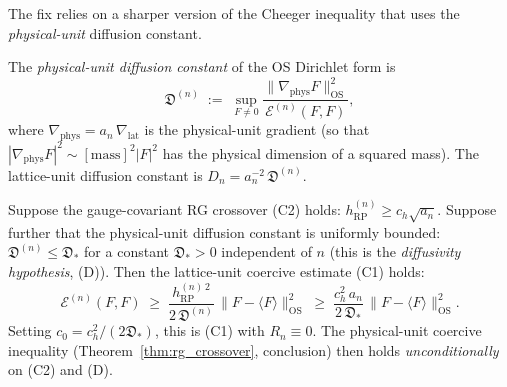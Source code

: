 The fix relies on a sharper version of the Cheeger inequality that
uses the \emph{physical-unit} diffusion constant.

\begin{definition}
\label{def:diff_phys}
The \emph{physical-unit diffusion constant} of the OS Dirichlet
form is
\begin{equation}
\label{eq:D_phys_def}
  \mathfrak{D}^{(n)}
  \;:=\;\sup_{F\ne 0}
  \frac{\|\nabla_{\mathrm{phys}}F\|_{\mathrm{OS}}^{2}}
       {\mathcal{E}^{(n)}(F,F)},
\end{equation}
where $\nabla_{\mathrm{phys}}=a_{n}\,\nabla_{\mathrm{lat}}$ is the
physical-unit gradient (so that
$|\nabla_{\mathrm{phys}}F|^{2}\sim[\mathrm{mass}]^{2}|F|^{2}$ has
the physical dimension of a squared mass). The lattice-unit
diffusion constant is $D_{n}=a_{n}^{-2}\,\mathfrak{D}^{(n)}$.
\end{definition}

\begin{theorem}
\label{thm:sharp_coercive}
Suppose the gauge-covariant RG crossover (C2) holds:
$h_{\mathrm{RP}}^{(n)}\ge c_{h}\sqrt{a_{n}}$. Suppose further
that the physical-unit diffusion constant is uniformly bounded:
$\mathfrak{D}^{(n)}\le\mathfrak{D}_{*}$ for a constant
$\mathfrak{D}_{*}>0$ independent of $n$ (this is the
\emph{diffusivity hypothesis}, (D)). Then the lattice-unit
coercive estimate (C1) holds:
\begin{equation}
\label{eq:sharp_coercive}
  \mathcal{E}^{(n)}(F,F)
  \;\ge\;\frac{h_{\mathrm{RP}}^{(n)\,2}}{2\,\mathfrak{D}^{(n)}}\,
  \|F-\langle F\rangle\|_{\mathrm{OS}}^{2}
  \;\ge\;\frac{c_{h}^{2}\,a_{n}}{2\,\mathfrak{D}_{*}}\,
  \|F-\langle F\rangle\|_{\mathrm{OS}}^{2}.
\end{equation}
Setting $c_{0}=c_{h}^{2}/(2\mathfrak{D}_{*})$, this is (C1) with
$R_{n}\equiv 0$. The physical-unit coercive inequality
(Theorem~\ref{thm:rg_crossover}, conclusion) then holds
\emph{unconditionally} on (C2) and (D).
\end{theorem}

